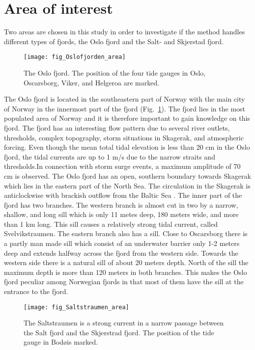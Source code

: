 \section{Area of interest}
Two areas are chosen in this study in order to investigate if the method handles different types of fjords, the Oslo fjord and the Salt- and Skjerstad fjord.

\begin{figure}[!t]
\centering
\texttt{[image: fig\_Oslofjorden\_area]}
\caption{The Oslo fjord. The position of the four tide gauges in Oslo, Oscarsborg, Viker, and Helgeroa are marked.}
\label{fig:area1}
\end{figure}

The Oslo fjord is located in the southeastern part of Norway with the main city of Norway in the innermost part of the fjord (Fig.~\ref{fig:area1}). The fjord lies in the most populated area of Norway and it is therefore important to gain knowledge on this fjord. The fjord has an interesting flow pattern due to several river outlets, thresholds, complex topography, storm situations in Skagerak, and atmospheric forcing. 
Even though the mean total tidal elevation is less than 20 cm in the Oslo fjord, the tidal currents are up to 1 m/s due to the narrow straits and thresholds.In connection with storm surge events, a maximum amplitude of 70 cm is observed. The Oslo fjord has an open, southern boundary towards Skagerak which lies in the eastern part of the North Sea. The circulation in the Skagerak is anticlockwise with brackish outflow from the Baltic Sea \cite[]{rodhe96,svendsen96}. 
The inner part of the fjord has two branches. The western branch is almost cut in two by a narrow, shallow, and long sill which is only 11 metes deep, 180 meters wide, and more than 1 km long. This sill causes a relatively strong tidal current, called Svelvikstraumen. The eastern branch also has a sill. Close to Oscarsborg there is a partly man made sill which consist of an underwater barrier only 1-2 meters deep and extends halfway across the fjord from the western side. Towards the western side there is a natural sill of about 20 meters depth. North of the sill the maximum depth is more than 120 meters in both branches.  This makes the Oslo fjord peculiar among Norwegian fjords in that most of them have the sill at the entrance to the fjord.

\begin{figure}[!t]
\centering
\texttt{[image: fig\_Saltstraumen\_area]}
\caption{The Saltstraumen is a strong current in a narrow passage between the Salt fjord and the Skjerstrad fjord. The position of the tide gauge in Bod\o is marked.}
\label{fig:area2}
\end{figure}


